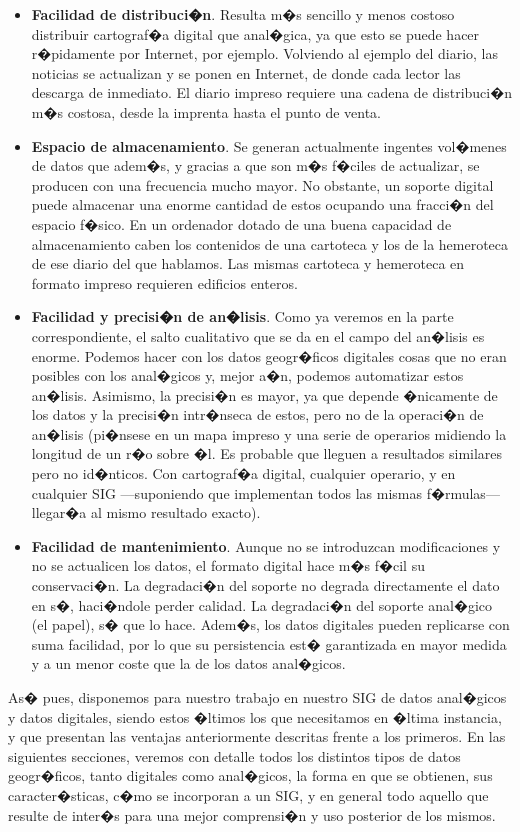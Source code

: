 \begin{itemize}
\item \textbf{Facilidad de distribuci�n}. Resulta m�s sencillo y menos costoso distribuir cartograf�a digital que anal�gica, ya que esto se puede hacer r�pidamente por Internet, por ejemplo. Volviendo al ejemplo del diario, las noticias se actualizan y se ponen en Internet, de donde cada lector las descarga de inmediato. El diario impreso requiere una cadena de distribuci�n m�s costosa, desde la imprenta hasta el punto de venta.
\item \textbf{Espacio de almacenamiento}. Se generan actualmente ingentes vol�menes de datos que adem�s, y gracias a que son m�s f�ciles de actualizar, se producen con una frecuencia mucho mayor. No obstante, un soporte digital puede almacenar una enorme cantidad de estos ocupando una fracci�n del espacio f�sico. En un ordenador dotado de una buena capacidad de almacenamiento caben los contenidos de una cartoteca y los de la hemeroteca de ese diario del que hablamos. Las mismas cartoteca y hemeroteca en formato impreso requieren edificios enteros.
\item \textbf{Facilidad y precisi�n de an�lisis}. Como ya veremos en la parte correspondiente, el salto cualitativo que se da en el campo del an�lisis es enorme. Podemos hacer con los datos geogr�ficos digitales cosas que no eran posibles con los anal�gicos y, mejor a�n, podemos automatizar estos an�lisis. Asimismo, la precisi�n es mayor, ya que depende �nicamente de los datos y la precisi�n intr�nseca de estos, pero no de la operaci�n de an�lisis (pi�nsese en un mapa impreso y una serie de operarios midiendo la longitud de un r�o sobre �l. Es probable que lleguen a resultados similares pero no id�nticos. Con cartograf�a digital, cualquier operario, y en cualquier SIG ---suponiendo que implementan todos las mismas f�rmulas--- llegar�a al mismo resultado exacto).
\item \textbf{Facilidad de mantenimiento}. Aunque no se introduzcan modificaciones y no se actualicen los datos, el formato digital hace m�s f�cil su conservaci�n. La degradaci�n del soporte no degrada directamente el dato en s�, haci�ndole perder calidad. La degradaci�n del soporte anal�gico (el papel), s� que lo hace. Adem�s, los datos digitales pueden replicarse con suma facilidad, por lo que su persistencia est� garantizada en mayor medida y a un menor coste que la de los datos anal�gicos.
\end{itemize}

As� pues, disponemos para nuestro trabajo en nuestro SIG de datos anal�gicos y datos digitales, siendo estos �ltimos los que necesitamos en �ltima instancia, y que presentan las ventajas anteriormente descritas frente a los primeros. En las siguientes secciones, veremos con detalle todos los distintos tipos de datos geogr�ficos, tanto digitales como anal�gicos, la forma en que se obtienen, sus caracter�sticas, c�mo se incorporan a un SIG, y en general todo aquello que resulte de inter�s para una mejor comprensi�n y uso posterior de los mismos. 

